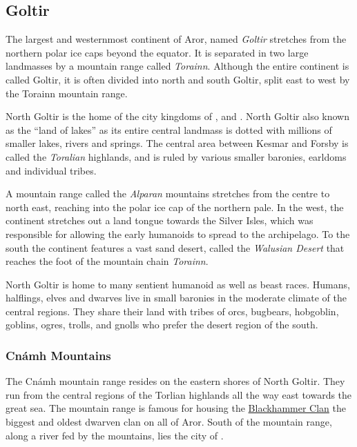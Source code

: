 \subsection{Goltir}
\label{sec:Goltir}

The largest and westernmost continent of Aror, named \emph{Goltir} stretches
from the northern polar ice caps beyond the equator. It is separated in two
large landmasses by a mountain range called \emph{Torainn}. Although the
entire continent is called Goltir, it is often divided into north and south
Goltir, split east to west by the Torainn mountain range.

North Goltir is the home of the city kingdoms of ,
 and . North Goltir also known as
the ``land of lakes'' as its entire central landmass is dotted with millions
of smaller lakes, rivers and springs. The central area between Kesmar and
Forsby is called the \emph{Toralian} highlands, and is ruled by various smaller
baronies, earldoms and individual tribes.

A mountain range called the \emph{Alparan} mountains stretches from the centre
to north east, reaching into the polar ice cap of the northern pale. In the
west, the continent stretches out a land tongue towards the Silver Isles,
which was responsible for allowing the early humanoids to spread to the
archipelago. To the south the continent features a vast sand desert, called
the \emph{Walusian Desert} that reaches the foot of the mountain chain
\emph{Torainn}.

North Goltir is home to many sentient humanoid as well as beast races. Humans,
halflings, elves and dwarves live in small baronies in the moderate climate of
the central regions. They share their land with tribes of orcs, bugbears,
hobgoblin, goblins, ogres, trolls, and gnolls who prefer the desert region of
the south.

\subsubsection{Cnámh Mountains}
\label{sec:Cnamh Mountains}

The Cnámh mountain range resides on the eastern shores of North Goltir. They
run from the central regions of the Torlian highlands all the way east towards
the great sea. The mountain range is famous for housing the
\hyperref[sec:Kesmar]{Blackhammer Clan} the biggest and oldest dwarven clan on
all of Aror. South of the mountain range, along a river fed by the mountains,
lies the city of .

